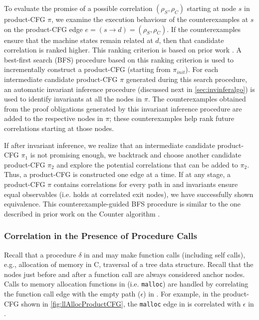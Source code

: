 To evaluate the promise of a possible correlation $(\rho_S,\rho_C)$ starting at node $s$
in product-CFG $\pi$, we examine the execution behaviour of the counterexamples at $s$ on
the product-CFG edge $e=(s\rightarrow d)=(\rho_S,\rho_C)$.
If the counterexamples ensure that the machine states remain related at $d$,
then that candidate correlation is ranked higher.
This ranking criterion is based on prior work \cite{oopsla20}.
A best-first search (BFS) procedure based on this ranking criterion is used to incrementally construct
a product-CFG (starting from $\pi_{init}$).
For each intermediate candidate product-CFG $\pi$ generated during this search procedure,
an automatic invariant inference procedure (discussed next in \cref{sec:invinferalgo}) is
used to identify invariants at all the nodes in $\pi$.
The counterexamples obtained from the proof obligations generated by this invariant inference
procedure are added to the respective nodes in $\pi$; these counterexamples help rank
future correlations starting at those nodes.

If after invariant inference, we realize that an intermediate candidate product-CFG $\pi_1$
is not promising enough, we backtrack and choose another candidate product-CFG $\pi_2$
and explore the potential correlations that can be added to $\pi_2$.
Thus, a product-CFG is constructed one edge at a time.
If at any stage, a product-CFG $\pi$ contains correlations for every path in \cprog{}
and invariants ensure equal observables (i.e. \post{} holds at correlated exit nodes),
we have successfully shown equivalence.
This counterexample-guided BFS procedure is similar to the one described in prior work on
the Counter algorithm \cite{oopsla20}.

\subsubsection{Correlation in the Presence of Procedure Calls}
\label{sec:correlfcalls}
Recall that a procedure $\delta$ in \sprog{} and \cprog{} may make function calls (including self calls),
e.g., allocation of memory in C, traversal of a tree data structure.
Recall that the nodes just before and after a function call are always considered anchor nodes.
Calls to memory allocation functions in \cprog{} (i.e. {\tt malloc}) are handled by correlating
the function call edge with the empty path ($\epsilon$) in \sprog{}.
For example, in the product-CFG shown in \cref{fig:llAllocProductCFG}, the {\tt malloc} edge  in \cprog{}
is correlated with $\epsilon$ in \sprog{}.

